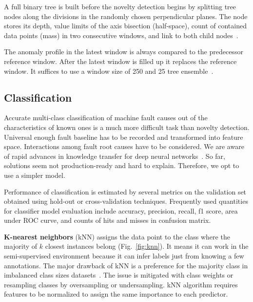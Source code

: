 A full binary tree is built before the novelty detection begins by splitting tree nodes along the divisions in the randomly chosen perpendicular planes. The node stores its depth, value limits of the axis bisection (half-space), count of contained data points (mass) in two consecutive windows, and link to both child nodes~\cite{tan_fast_2011}. 

The anomaly profile in the latest window is always compared to the predecessor reference window. After the latest window is filled up it replaces the reference window. It suffices to use a window size of 250 and 25 tree ensemble~\cite{tan_fast_2011}.

\subsection{Classification}
Accurate multi-class classification of machine fault causes out of the characteristics of known ones is a much more difficult task than novelty detection. Universal enough fault baseline has to be recorded and transformed into feature space. Interactions among fault root causes have to be considered. We are aware of rapid advances in knowledge transfer for deep neural networks~\cite{maurya_condition-based_2021}. So far, solutions seem not production-ready and hard to explain. Therefore, we opt to use a simpler model.

Performance of classification is estimated by several metrics on the validation set obtained using hold-out or cross-validation techniques. Frequently used quantities for classifier model evaluation include accuracy, precision, recall, f1 score, area under ROC curve, and counts of hits and misses in confusion matrix.
\bigbreak

\textbf{K-nearest neighbors} (kNN) assigns the data point to the class where the majority of $k$ closest instances belong (Fig.~\ref{fig:knn}). It means it can work in the semi-supervised environment because it can infer labels just from knowing a few annotations. The major drawback of kNN is a preference for the majority class in imbalanced class sizes datasets~\cite{shi_improving_2020}. The issue is mitigated with class weights or resampling classes by oversampling or undersampling. kNN algorithm requires features to be normalized to assign the same importance to each predictor.


